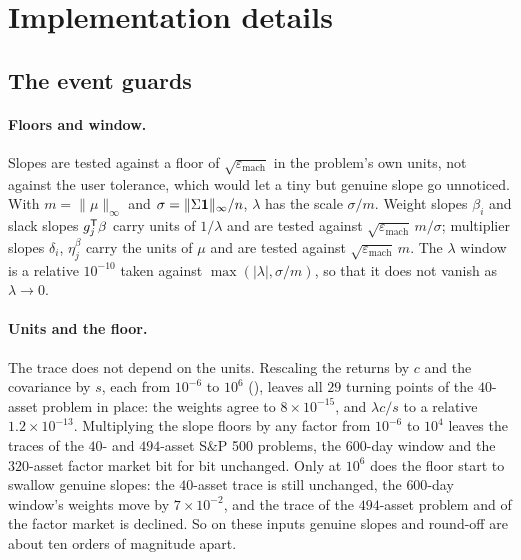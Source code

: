 \section{Implementation details}
\label{sec:details}

\subsection{The event guards}
\label{sec:guards}

\paragraph{Floors and window.}
Slopes are tested against a floor of $\sqrt{\varepsilon_{\text{mach}}}$ in the
problem's own units, not against the user tolerance, which would let a tiny but genuine
slope go unnoticed. With $m = \lVert\mu\rVert_\infty$ and
$\sigma = \lVert\Sigma\mathbf{1}\rVert_\infty/n$, $\lambda$ has the scale $\sigma/m$.
Weight slopes $\beta_i$ and slack slopes $g_j^{\mathsf{T}}\beta$ carry units of $1/\lambda$
and are tested against $\sqrt{\varepsilon_{\text{mach}}}\,m/\sigma$; multiplier slopes
$\delta_i$, $\eta^{\beta}_j$ carry the units of $\mu$ and are tested against
$\sqrt{\varepsilon_{\text{mach}}}\,m$. The $\lambda$ window is a relative $10^{-10}$
taken against $\max(\lvert\lambda\rvert, \sigma/m)$, so that it does not vanish as
$\lambda \to 0$.

\paragraph{Units and the floor.}
\label{sec:invariance}\label{sec:moreexp}%
The trace does not depend on the units. Rescaling the returns by $c$ and the covariance
by $s$, each from $10^{-6}$ to $10^{6}$ (), leaves all $29$
turning points of the $40$-asset problem in place: the weights agree to
$8\times10^{-15}$, and $\lambda c/s$ to a relative $1.2\times10^{-13}$. Multiplying the
slope floors by any factor from $10^{-6}$ to $10^{4}$ leaves the traces of the $40$- and
$494$-asset S\&P 500 problems, the $600$-day window and the $320$-asset factor market bit
for bit unchanged. Only at $10^{6}$ does the floor start to swallow genuine slopes: the
$40$-asset trace is still unchanged, the $600$-day window's weights move by
$7\times10^{-2}$, and the trace of the $494$-asset problem and of the factor market is
declined. So on these inputs genuine slopes and round-off are about ten orders of
magnitude apart.

